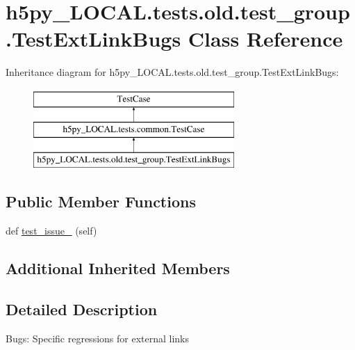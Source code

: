 \hypertarget{classh5py__LOCAL_1_1tests_1_1old_1_1test__group_1_1TestExtLinkBugs}{}\section{h5py\+\_\+\+L\+O\+C\+A\+L.\+tests.\+old.\+test\+\_\+group.\+Test\+Ext\+Link\+Bugs Class Reference}
\label{classh5py__LOCAL_1_1tests_1_1old_1_1test__group_1_1TestExtLinkBugs}
Inheritance diagram for h5py\+\_\+\+L\+O\+C\+A\+L.\+tests.\+old.\+test\+\_\+group.\+Test\+Ext\+Link\+Bugs\+:\begin{figure}[H]
\begin{center}
\leavevmode
\includegraphics[height=3.000000cm]{classh5py__LOCAL_1_1tests_1_1old_1_1test__group_1_1TestExtLinkBugs}
\end{center}
\end{figure}
\subsection*{Public Member Functions}
\begin{DoxyCompactItemize}
\item 
def \hyperlink{classh5py__LOCAL_1_1tests_1_1old_1_1test__group_1_1TestExtLinkBugs_aa6bf228f6fb84f95187e7844e97ffbd5}{test\+\_\+issue\+\_} (self)
\end{DoxyCompactItemize}
\subsection*{Additional Inherited Members}


\subsection{Detailed Description}
\begin{DoxyVerb}    Bugs: Specific regressions for external links
\end{DoxyVerb}
 

